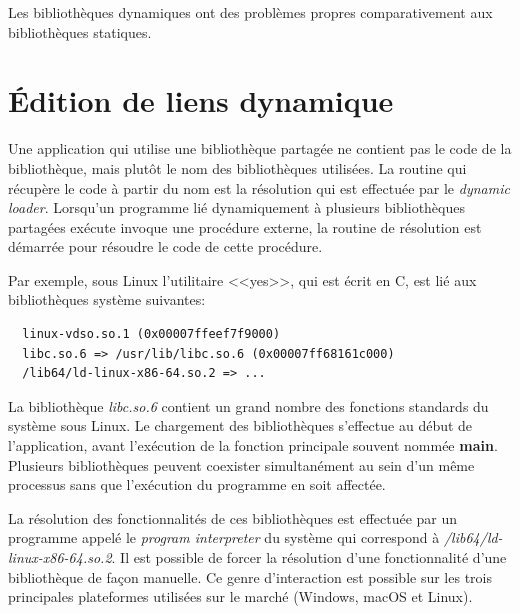 Les bibliothèques dynamiques ont des problèmes propres comparativement aux
bibliothèques statiques.




\section{Édition de liens dynamique}

Une application qui utilise une bibliothèque partagée ne contient pas le code
de la bibliothèque, mais plutôt le nom des bibliothèques utilisées.  La
routine qui récupère le code à partir du nom est la
résolution qui est effectuée par le \textit{dynamic loader}.  Lorsqu'un
programme lié dynamiquement à plusieurs bibliothèques partagées exécute invoque
une procédure externe, la routine de résolution est démarrée pour résoudre le
code de cette procédure.

Par exemple, sous Linux l'utilitaire <<yes>>, qui est écrit en C,
est lié aux bibliothèques système suivantes:
\begin{verbatim}
  linux-vdso.so.1 (0x00007ffeef7f9000)
  libc.so.6 => /usr/lib/libc.so.6 (0x00007ff68161c000)
  /lib64/ld-linux-x86-64.so.2 => ...
\end{verbatim}

La bibliothèque \textit{libc.so.6} contient un grand nombre des fonctions
standards du système sous Linux.  Le chargement des bibliothèques s'effectue au
début de l'application, avant l'exécution de la fonction principale souvent
nommée \textbf{main}. Plusieurs bibliothèques peuvent coexister simultanément
au sein d'un même processus sans que l'exécution du programme en soit affectée.

La résolution des fonctionnalités de ces bibliothèques est effectuée par un
programme appelé le \textit{program interpreter} du système qui correspond à
\textit{/lib64/ld-linux-x86-64.so.2}.  Il est possible de forcer la résolution
d'une fonctionnalité d'une bibliothèque de façon manuelle. Ce genre d'interaction
est possible sur les trois principales plateformes utilisées sur le marché
(Windows, macOS et Linux).

